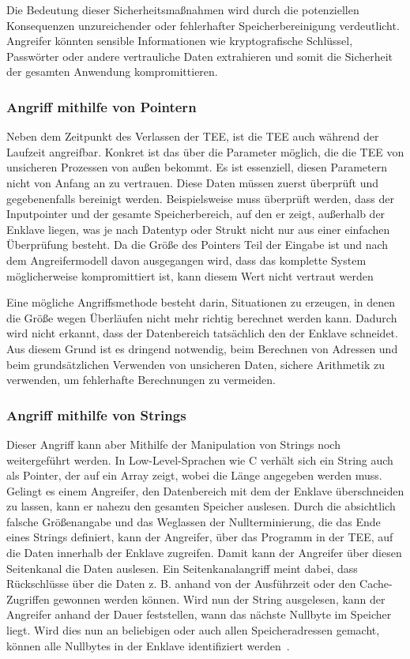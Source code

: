 Die Bedeutung dieser Sicherheitsmaßnahmen wird durch die potenziellen Konsequenzen unzureichender oder fehlerhafter Speicherbereinigung verdeutlicht. Angreifer könnten sensible Informationen wie kryptografische Schlüssel, Passwörter oder andere vertrauliche Daten extrahieren und somit die Sicherheit der gesamten Anwendung kompromittieren.

\subsubsection{Angriff mithilfe von Pointern}
Neben dem Zeitpunkt des Verlassen der TEE, ist die TEE auch während der Laufzeit angreifbar. Konkret ist das über die Parameter möglich, die die TEE von unsicheren Prozessen von außen bekommt. Es ist essenziell, diesen Parametern nicht von Anfang an zu vertrauen. Diese Daten müssen zuerst überprüft und gegebenenfalls bereinigt werden.  Beispielsweise muss überprüft werden, dass der Inputpointer und der gesamte Speicherbereich, auf den er zeigt, außerhalb der Enklave liegen, was je nach Datentyp oder Strukt nicht nur aus einer einfachen Überprüfung besteht. Da die Größe des Pointers Teil der Eingabe ist und nach dem Angreifermodell davon ausgegangen wird, dass das komplette System möglicherweise kompromittiert ist, kann diesem Wert nicht vertraut werden

Eine mögliche Angriffsmethode besteht darin, Situationen zu erzeugen, in denen die Größe wegen Überläufen nicht mehr richtig berechnet werden kann. Dadurch wird nicht erkannt, dass der Datenbereich tatsächlich den der Enklave schneidet. Aus diesem Grund ist es dringend notwendig, beim Berechnen von Adressen und beim grundsätzlichen Verwenden von unsicheren Daten, sichere Arithmetik zu verwenden, um fehlerhafte Berechnungen zu vermeiden.

\subsubsection{Angriff mithilfe von Strings}
Dieser Angriff kann aber Mithilfe der Manipulation von Strings noch weitergeführt werden. In Low-Level-Sprachen wie C verhält sich ein String auch als Pointer, der auf ein Array zeigt, wobei die Länge angegeben werden muss. 
Gelingt es einem Angreifer, den Datenbereich mit dem der Enklave überschneiden zu lassen, kann er nahezu den gesamten Speicher auslesen. Durch die absichtlich falsche Größenangabe und das Weglassen der Nullterminierung, die das Ende eines Strings definiert, kann der Angreifer, über das Programm in der TEE, auf die Daten innerhalb der Enklave zugreifen. 
Damit kann der Angreifer über diesen Seitenkanal die Daten auslesen. 
Ein Seitenkanalangriff meint dabei, dass Rückschlüsse über die Daten z. B. anhand von der Ausführzeit oder den Cache-Zugriffen gewonnen werden können. Wird nun der String ausgelesen, kann der Angreifer anhand der Dauer feststellen, wann das nächste Nullbyte im Speicher liegt. 
Wird dies nun an beliebigen oder auch allen Speicheradressen gemacht, können alle Nullbytes in der Enklave identifiziert werden~\cite{TEEPaper}.

